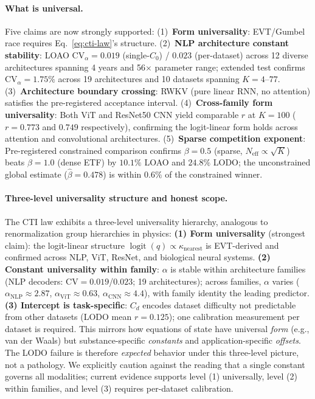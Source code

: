 \documentclass{article}
\DeclareMathOperator{\logit}{logit}
\begin{document}
\paragraph{What is universal.}
Five claims are now strongly supported:
(1)~\textbf{Form universality}: EVT/Gumbel race requires Eq.~\ref{eq:cti-law}'s structure.
(2)~\textbf{NLP architecture constant stability}: LOAO $\mathrm{CV}_\alpha=0.019$ (single-$C_0$) / $0.023$ (per-dataset) across 12 diverse architectures spanning 4 years and 56$\times$ parameter range; extended test confirms $\mathrm{CV}_\alpha=1.75\%$ across 19 architectures and 10 datasets spanning $K=4$--$77$.
(3)~\textbf{Architecture boundary crossing}: RWKV (pure linear RNN, no attention) satisfies the pre-registered acceptance interval.
(4)~\textbf{Cross-family form universality}: Both ViT and ResNet50 CNN yield comparable $r$ at $K=100$ ($r=0.773$ and $0.749$ respectively), confirming the logit-linear form holds across attention and convolutional architectures.
(5)~\textbf{Sparse competition exponent}: Pre-registered constrained comparison confirms $\beta=0.5$
(sparse, $N_\mathrm{eff}\propto\sqrt{K}$) beats $\beta=1.0$ (dense ETF) by $10.1\%$ LOAO and $24.8\%$
LODO; the unconstrained global estimate ($\hat\beta=0.478$) is within $0.6\%$ of the constrained winner.

\paragraph{Three-level universality structure and honest scope.}
The CTI law exhibits a three-level universality hierarchy, analogous to renormalization group hierarchies in physics:
\textbf{(1) Form universality} (strongest claim): the logit-linear structure $\logit(q)\propto\kappa_{\mathrm{nearest}}$ is EVT-derived and confirmed across NLP, ViT, ResNet, and biological neural systems.
\textbf{(2) Constant universality within family}: $\alpha$ is stable within architecture families (NLP decoders: CV$=0.019$/$0.023$; 19 architectures); across families, $\alpha$ varies ($\alpha_\mathrm{NLP}\approx2.87$, $\alpha_\mathrm{ViT}\approx0.63$, $\alpha_\mathrm{CNN}\approx4.4$), with family identity the leading predictor.
\textbf{(3) Intercept is task-specific}: $C_d$ encodes dataset difficulty not predictable from other datasets (LODO mean $r=0.125$); one calibration measurement per dataset is required.
This mirrors how equations of state have universal \emph{form} (e.g., van der Waals) but substance-specific \emph{constants} and application-specific \emph{offsets}. The LODO failure is therefore \emph{expected} behavior under this three-level picture, not a pathology.
We explicitly caution against the reading that a single constant governs all modalities; current evidence supports level (1) universally, level (2) within families, and level (3) requires per-dataset calibration.
\end{document}
